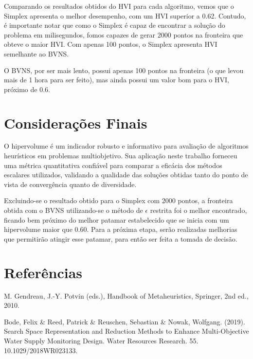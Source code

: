 \documentclass[
	12pt,				%
	oneside,			%
	a4paper,			%
	chapter=TITLE,
	sumario=tradicional,
	english,			%
	brazil				%
]{abntex2}
\begin{document}
Comparando os resultados obtidos do HVI para cada algoritmo, vemos que o Simplex apresenta o melhor 
desempenho, com um HVI superior a 0.62. Contudo, é importante notar que como o Simplex é capaz de 
encontrar a solução do problema em milisegundos, fomos capazes de gerar 2000 pontos na fronteira 
que obteve o maior HVI. Com apenas 100 pontos, o Simplex apresenta HVI semelhante ao BVNS.

O BVNS, por ser mais lento, possui apenas 100 pontos na fronteira (o que levou mais de 1 hora para ser feito), 
mas ainda possui um valor bom para o HVI, próximo de 0.6.

\chapter{Considerações Finais}

O hipervolume é um indicador robusto e informativo para avaliação de algoritmos heurísticos em problemas multiobjetivo. Sua aplicação neste trabalho
forneceu uma métrica quantitativa confiável para comparar a eficácia dos métodos escalares utilizados, validando a qualidade das soluções obtidas tanto do ponto de
vista de convergência quanto de diversidade.

Excluindo-se o resultado obtido para o Simplex com 2000 pontos, a fronteira obtida com o BVNS utilizando-se o método de $\epsilon$ restrita foi o melhor encontrado, ficando bem
próximo do melhor patamar estabelecido que se inicia com um hipervolume maior que $0.60$. Para a próxima etapa, serão realizadas melhorias que permitirão atingir esse patamar,
para então ser feita a tomada de decisão.


\chapter{Referências}\label{cap:referencias} 

\noindent M. Gendreau, J.-Y. Potvin (eds.), Handbook of Metaheuristics, Springer, 2nd ed., 2010.

\noindent Bode, Felix \& Reed, Patrick \& Reuschen, Sebastian \& Nowak, Wolfgang. (2019). Search Space Representation and Reduction Methods to Enhance Multi-Objective Water Supply Monitoring Design. Water Resources Research. 55. 10.1029/2018WR023133. 
\end{document}
